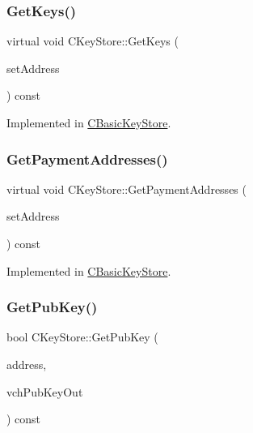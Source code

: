 \subsubsection{\texorpdfstring{Get\+Keys()}{GetKeys()}}
{\footnotesize\ttfamily virtual void C\+Key\+Store\+::\+Get\+Keys (\begin{DoxyParamCaption}\item[{std\+::set$<$ \mbox{\hyperlink{class_c_key_i_d}{C\+Key\+ID}} $>$ \&}]{set\+Address }\end{DoxyParamCaption}) const\hspace{0.3cm}{\ttfamily [pure virtual]}}



Implemented in \mbox{\hyperlink{class_c_basic_key_store_a41f3895021dae008582ceb55a98b0891}{C\+Basic\+Key\+Store}}.

\mbox{\label{class_c_key_store_a6186d83956656316f3fe679b4f907866}} 
\subsubsection{\texorpdfstring{Get\+Payment\+Addresses()}{GetPaymentAddresses()}}
{\footnotesize\ttfamily virtual void C\+Key\+Store\+::\+Get\+Payment\+Addresses (\begin{DoxyParamCaption}\item[{std\+::set$<$ libzcash\+::\+Payment\+Address $>$ \&}]{set\+Address }\end{DoxyParamCaption}) const\hspace{0.3cm}{\ttfamily [pure virtual]}}



Implemented in \mbox{\hyperlink{class_c_basic_key_store_af02668c3bef8b5a56231505f900a0314}{C\+Basic\+Key\+Store}}.

\mbox{\label{class_c_key_store_ab83687ea4c9df138b21f6ec3e9809f42}} 
\subsubsection{\texorpdfstring{Get\+Pub\+Key()}{GetPubKey()}}
{\footnotesize\ttfamily bool C\+Key\+Store\+::\+Get\+Pub\+Key (\begin{DoxyParamCaption}\item[{const \mbox{\hyperlink{class_c_key_i_d}{C\+Key\+ID}} \&}]{address,  }\item[{\mbox{\hyperlink{class_c_pub_key}{C\+Pub\+Key}} \&}]{vch\+Pub\+Key\+Out }\end{DoxyParamCaption}) const\hspace{0.3cm}{\ttfamily [virtual]}}

